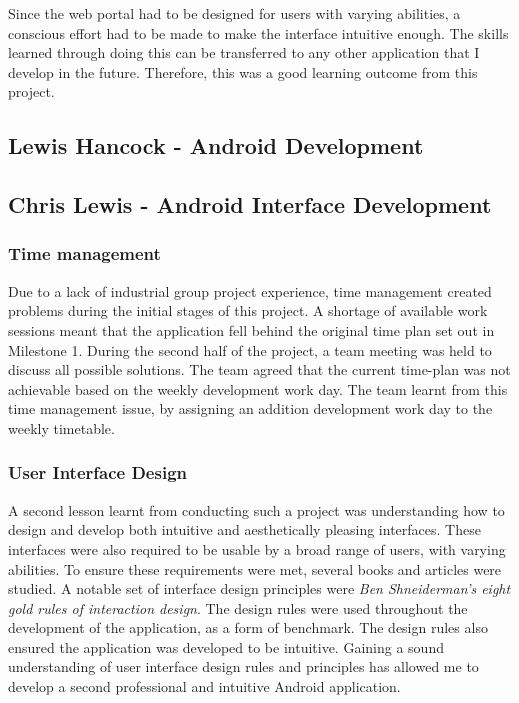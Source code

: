 \documentclass[11pt,a4paper]{report}
\begin{document}
Since the web portal had to be designed for users with varying abilities, a conscious effort had to be made to make the interface intuitive enough. The skills learned through doing this can be transferred to any other application that I develop in the future. Therefore, this was a good learning outcome from this project.

\subsection{Lewis Hancock - Android Development}
\subsection{Chris Lewis - Android Interface Development}

\subsubsection{Time management}

Due to a lack of industrial group project experience, time management created problems during the initial stages of this project. A shortage of available work sessions meant that the application fell behind the original time plan set out in Milestone 1. During the second half of the project, a team meeting was held to discuss all possible solutions. The team agreed that the current time-plan was not achievable based on the weekly development work day. The team learnt from this time management issue, by assigning an addition development work day to the weekly timetable.

\subsubsection{User Interface Design}

A second lesson learnt from conducting such a project was understanding how to design and develop both intuitive and aesthetically pleasing interfaces. These interfaces were also required to be usable by a broad range of users, with varying abilities. To ensure these requirements were met, several books and articles were studied. A notable set of interface design principles were \emph{Ben Shneiderman's eight gold rules of interaction design}. The design rules were used throughout the development of the application, as a form of benchmark. The design rules also ensured the application was developed to be intuitive. Gaining a sound understanding of user interface design rules and principles has allowed me to develop a second professional and intuitive Android application.   
\end{document}
